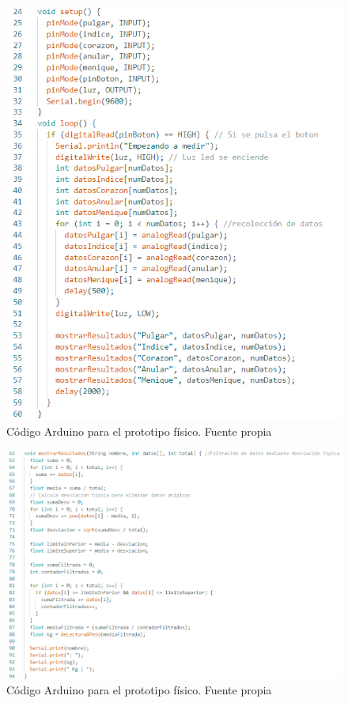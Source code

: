 \begin{figure}
    \centering
    \includegraphics[width=1\linewidth]{img/CodigoArduino2.png}
    \caption{Código Arduino para el prototipo físico. Fuente propia}
    \label{fig:CodigoArduino2}
\end{figure}
\begin{figure}
    \includegraphics[width=1.25\linewidth]{img/CodigoArduino3.png}
    \caption{Código Arduino para el prototipo físico. Fuente propia}
    \label{fig:CodigoArduino3}
\end{figure}
